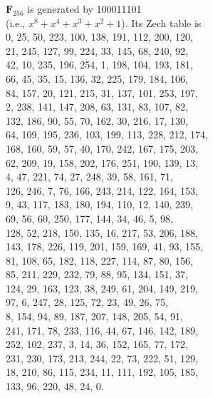 \documentclass[a4paper]{article}
\def\FF{\mathbf F}
\begin{document}
$\FF_{256}$ is generated by 100011101 \\
(i.e., $x^8 + x^4 + x^3 + x^2 + 1$).
Its Zech table is \\
0, 25, 50, 223, 100, 138, 191, 112, 200, 120, \\
21, 245, 127, 99, 224, 33, 145, 68, 240, 92, \\
42, 10, 235, 196, 254, 1, 198, 104, 193, 181, \\
66, 45, 35, 15, 136, 32, 225, 179, 184, 106, \\
84, 157, 20, 121, 215, 31, 137, 101, 253, 197, \\
2, 238, 141, 147, 208, 63, 131, 83, 107, 82, \\
132, 186, 90, 55, 70, 162, 30, 216, 17, 130, \\
64, 109, 195, 236, 103, 199, 113, 228, 212, 174, \\
168, 160, 59, 57, 40, 170, 242, 167, 175, 203, \\
62, 209, 19, 158, 202, 176, 251, 190, 139, 13, \\
4, 47, 221, 74, 27, 248, 39, 58, 161, 71, \\
126, 246, 7, 76, 166, 243, 214, 122, 164, 153, \\
9, 43, 117, 183, 180, 194, 110, 12, 140, 239, \\
69, 56, 60, 250, 177, 144, 34, 46, 5, 98, \\
128, 52, 218, 150, 135, 16, 217, 53, 206, 188, \\
143, 178, 226, 119, 201, 159, 169, 41, 93, 155, \\
81, 108, 65, 182, 118, 227, 114, 87, 80, 156, \\
85, 211, 229, 232, 79, 88, 95, 134, 151, 37, \\
124, 29, 163, 123, 38, 249, 61, 204, 149, 219, \\
97, 6, 247, 28, 125, 72, 23, 49, 26, 75, \\
8, 154, 94, 89, 187, 207, 148, 205, 54, 91, \\
241, 171, 78, 233, 116, 44, 67, 146, 142, 189, \\
252, 102, 237, 3, 14, 36, 152, 165, 77, 172, \\
231, 230, 173, 213, 244, 22, 73, 222, 51, 129, \\
18, 210, 86, 115, 234, 11, 111, 192, 105, 185, \\
133, 96, 220, 48, 24, 0.


\vskip-1.5cm
\end{document}
